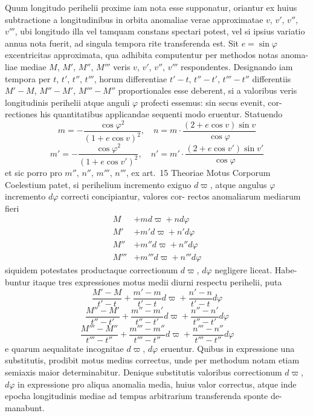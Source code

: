 \documentclass[12pt,a4paper]{article}
\begin{document}
Quum longitudo perihelii proxime iam nota esse supponatur, oriantur
ex huius subtractione a longitudinibus in orbita anomaliae verae approximatae
$v$, $v'$, $v''$, $v'''$, ubi longitudo illa vel tamquam constans spectari potest, vel si ipsius
variatio annua nota fuerit, ad singula tempora rite transferenda est. Sit $e = \sin\varphi$
excentricitas approximata, qua adhibita computentur per methodos notas anoma-
liae mediae $M$, $M'$, $M''$, $M'''$ veris $v$, $v'$, $v''$, $v'''$ respondentes. Designando iam
tempora per $t$, $t'$, $t''$, $t'''$, horum differentiae $t' - t$, $t'' - t'$, $t''' - t''$ differentiis
$M' - M$, $M'' - M'$, $M''' - M''$ proportionales esse deberent, si a valoribus veris
longitudinis perihelii atque anguli $\varphi$ profecti essemus: sin secus evenit, cor-
rectiones his quantitatibus applicandae sequenti modo eruentur. Statuendo
\[
m = -\frac{\cos\varphi^2}{(1+e\cos v)^2}, \quad
n = m \cdot \frac{(2+e\cos v)\sin v}{\cos\varphi}
\]
\[
m' = -\frac{\cos\varphi^2}{(1+e\cos v')^2}, \quad
n' = m' \cdot \frac{(2+e\cos v')\sin v'}{\cos\varphi}
\]
et sic porro pro $m''$, $n''$, $m'''$, $n'''$, ex art.~15 Theoriae Motus Corporum Coelestium patet, si perihelium incremento
exiguo $d\varpi$, atque angulus $\varphi$ incremento $d\varphi$ correcti concipiantur, valores cor-
rectos anomaliarum mediarum fieri
\begin{align*}
M &+ md\varpi + nd\varphi \\
M' &+ m'd\varpi + n'd\varphi \\
M'' &+ m''d\varpi + n''d\varphi \\
M''' &+ m'''d\varpi + n'''d\varphi
\end{align*}
siquidem potestates productaque correctionum $d\varpi$, $d\varphi$ negligere liceat. Habe-
buntur itaque tres expressiones motus medii diurni respectu perihelii, puta
\[
\frac{M' - M}{t' - t} + \frac{m' - m}{t' - t}d\varpi + \frac{n' - n}{t' - t}d\varphi
\]
\[
\frac{M'' - M'}{t'' - t'} + \frac{m'' - m'}{t'' - t'}d\varpi + \frac{n'' - n'}{t'' - t'}d\varphi
\]
\[
\frac{M''' - M''}{t''' - t''} + \frac{m''' - m''}{t''' - t''}d\varpi + \frac{n''' - n''}{t''' - t''}d\varphi
\]
e quarum aequalitate incognitae $d\varpi$, $d\varphi$ eruentur. Quibus in expressione una
substitutis, prodibit motus medius correctus, unde per methodum notam etiam
semiaxis maior determinabitur. Denique substitutis valoribus correctionum
$d\varpi$, $d\varphi$ in expressione pro aliqua anomalia media, huius valor correctus, atque
inde epocha longitudinis mediae ad tempus arbitrarium transferenda sponte de-
manabunt.
\end{document}
